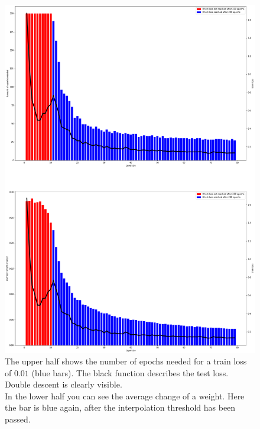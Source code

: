 \begin{figure}[!htp]
\centering
\includegraphics[scale=0.3]{Abschlussarbeit_2021/LaTeX/images/epochs_needed_15k.png}
\caption{The upper half shows the number of epochs needed for a train loss of $0.01$ (blue bars). The black function describes the test loss. Double descent is clearly visible. \\
In the lower half you can see the average change of a weight.  Here the bar is blue again, after the interpolation threshold has been passed.}
\label{avg_weightchange}
\end{figure}



